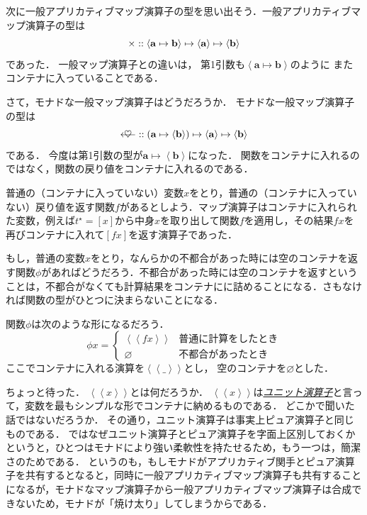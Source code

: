 \documentclass[a4paper]{jsbook}
\newcommand{\keyword}[1]{{\underline{\emph{#1}}}}
\newcommand{\mList}[1]{{#1}^\mathrm{\star}}
\newcommand{\mathTypeParameter}[1]{\mathbf{#1}}
\newcommand{\mathPureWith}[1]{\left\langle#1\right\rangle}
\newcommand{\mathUnitWith}[1]{\left\langle\!\left\langle#1\right\rangle\!\right\rangle}
\newcommand{\mathPureNothing}{\varnothing}
\newcommand{\mathAny}{\_}
\newcommand{\mathApplicativeGeneralMap}{\mathbin{\times}}
\newcommand{\mathBind}{\mathbin{\ooalign{$\longleftarrow$\crcr\hss$\heartsuit$\hss}}}
\newcommand{\mathIn}{\mathrel{::}}
\newcommand{\mathMapsTo}{\mapsto}
\newcommand{\mathMorph}[2]{#1\mathMapsTo#2}
\newcommand{\mathMorphII}[3]{#1\mathMapsTo#2\mathMapsTo#3}
\begin{document}
次に一般アプリカティブマップ演算子の型を思い出そう．一般アプリカティブマップ演算子の型は
\begin{equation}
\mathApplicativeGeneralMap
\mathIn{}\mathMorphII{\langle\mathMorph{\mathTypeParameter{a}}{\mathTypeParameter{b}}\rangle}{\langle\mathTypeParameter{a}\rangle}{\langle\mathTypeParameter{b}\rangle}\\
\end{equation}
であった．
一般マップ演算子との違いは，
第1引数も$\mathPureWith{\mathTypeParameter{a}\mapsto\mathTypeParameter{b}}$のように
またコンテナに入っていることである．

さて，モナドな一般マップ演算子はどうだろうか．
モナドな一般マップ演算子の型は
\begin{equation}
\mathBind
\mathIn{}\mathMorphII{(\mathMorph{\mathTypeParameter{a}}{\langle\mathTypeParameter{b}\rangle})}{\langle\mathTypeParameter{a}\rangle}{\langle{\mathTypeParameter{b}}\rangle}
\end{equation}
である．
今度は第1引数の型が$\mathTypeParameter{a}\mapsto\mathPureWith{\mathTypeParameter{b}}$になった．
関数をコンテナに入れるのではなく，関数の戻り値をコンテナに入れるのである．

普通の（コンテナに入っていない）変数$x$をとり，普通の（コンテナに入っていない）戻り値を返す関数$f$があるとしよう．マップ演算子はコンテナに入れられた変数，例えば$\mList{t}=[x]$から中身$x$を取り出して関数$f$を適用し，その結果$fx$を再びコンテナに入れて$[fx]$を返す演算子であった．

もし，普通の変数$x$をとり，なんらかの不都合があった時には空のコンテナを返す関数$\phi$があればどうだろう．不都合があった時には空のコンテナを返すということは，不都合がなくても計算結果をコンテナにに詰めることになる．さもなければ関数の型がひとつに決まらないことになる．

関数$\phi$は次のような形になるだろう．
$$\phi x=\begin{cases}\mathUnitWith{fx}&\text{普通に計算をしたとき}\\
\mathPureNothing&\text{不都合があったとき}\end{cases}$$
ここでコンテナに入れる演算を$\mathUnitWith{\mathAny}$とし，
空のコンテナを$\mathPureNothing$とした．

ちょっと待った．
$\mathUnitWith{x}$とは何だろうか．
$\mathUnitWith{x}$は\keyword{ユニット演算子}と言って，変数を最もシンプルな形でコンテナに納めるものである．
どこかで聞いた話ではないだろうか．
その通り，ユニット演算子は事実上ピュア演算子と同じものである．
ではなぜユニット演算子とピュア演算子を字面上区別しておくかというと，ひとつはモナドにより強い柔軟性を持たせるため，もう一つは，簡潔さのためである．
というのも，もしモナドがアプリカティブ関手とピュア演算子を共有するとなると，同時に一般アプリカティブマップ演算子も共有することになるが，モナドなマップ演算子から一般アプリカティブマップ演算子は合成できないため，モナドが「焼け太り」してしまうからである．
\end{document}
